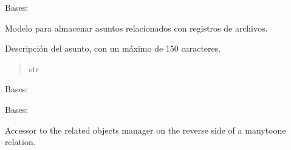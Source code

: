 \documentclass[letterpaper,10pt,spanish]{sphinxmanual}
\begin{document}
\begin{fulllineitems}

\pysigstartsignatures
{}
\pysigstopsignatures
\sphinxAtStartPar
Bases: 

\sphinxAtStartPar
Modelo para almacenar asuntos relacionados con registros de archivos.


\begin{fulllineitems}

\pysigstartsignatures
{}
\pysigstopsignatures
\sphinxAtStartPar
Descripción del asunto, con un máximo de 150 caracteres.
\begin{quote}\begin{description}
\sphinxAtStartPar
str

\end{description}\end{quote}

\end{fulllineitems}



\begin{fulllineitems}

\pysigstartsignatures
{}
\pysigstopsignatures
\sphinxAtStartPar
Bases: 

\end{fulllineitems}



\begin{fulllineitems}

\pysigstartsignatures
{}
\pysigstopsignatures
\sphinxAtStartPar
Bases: 

\end{fulllineitems}



\begin{fulllineitems}

\pysigstartsignatures
{}
\pysigstopsignatures
\sphinxAtStartPar
Accessor to the related objects manager on the reverse side of a
many\sphinxhyphen{}to\sphinxhyphen{}one relation.


\end{fulllineitems}
\end{fulllineitems}
\end{document}
